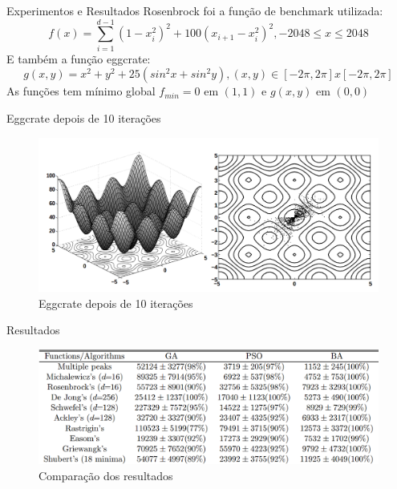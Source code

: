 \documentclass{beamer}
\begin{document}
  \begin{frame}{Experimentos e Resultados}
      Rosenbrock foi a função de benchmark utilizada:
      \begin{equation}
          f(x) = \sum \limits^{d-1}_{i=1} (1-x^{2}_i)^2 + 100(x_{i+1} - x^{2}_i)^2, -2048 \leq x \leq 2048
      \end{equation}
      E também a função eggcrate:
      \begin{equation}
          g(x,y) = x^2 + y^2 + 25(sin^2x + sin^2y), (x, y) \in [-2\pi, 2\pi] x [-2\pi, 2\pi]
      \end{equation}
      As funções tem mínimo global $f_{min} = 0$ em $(1,1)$ e $g(x,y)$ em $(0,0)$
  \end{frame}

  \begin{frame}{Eggcrate depois de 10 iterações}
      \begin{figure}
          \centering
          \includegraphics[width=1.0\textwidth]{eggcrate.png}
          \caption{Eggcrate depois de 10 iterações \cite{bat}}
      \end{figure}
  \end{frame}

  \begin{frame}{Resultados}
      \begin{figure}
          \centering
          \includegraphics[width=1.0\textwidth]{comparacao.png}
          \caption{Comparação dos resultados \cite{bat}}
      \end{figure}
  \end{frame}
\end{document}
